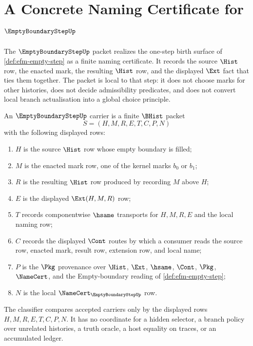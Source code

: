 \chapter{A Concrete Naming Certificate for $\EmptyBoundaryStepUp$}
\label{ch:concrete-instances-emptyboundarystep-namecert}

The $\EmptyBoundaryStepUp$ packet realizes the one-step birth surface of \autoref{def:efm-empty-step} as a finite naming certificate. It records the source $\Hist$ row, the enacted mark, the resulting $\Hist$ row, and the displayed $\Ext$ fact that ties them together. The packet is local to that step: it does not choose marks for other histories, does not decide admissibility predicates, and does not convert local branch actualisation into a global choice principle.

\begin{definition}
\label{def:empty-boundary-step-carrier}
An $\EmptyBoundaryStepUp$ carrier is a finite $\BHist$ packet
$$
S=(H,M,R,E,T,C,P,N)
$$
with the following displayed rows:
\begin{enumerate}
\item $H$ is the source $\Hist$ row whose empty boundary is filled;
\item $M$ is the enacted mark row, one of the kernel marks $b_0$ or $b_1$;
\item $R$ is the resulting $\Hist$ row produced by recording $M$ above $H$;
\item $E$ is the displayed $\Ext(H,M,R)$ row;
\item $T$ records componentwise $\hsame$ transports for $H,M,R,E$ and the local naming row;
\item $C$ records the displayed $\Cont$ routes by which a consumer reads the source row, enacted mark, result row, extension row, and local name;
\item $P$ is the $\Pkg$ provenance over $\Hist$, $\Ext$, $\hsame$, $\Cont$, $\Pkg$, $\NameCert$, and the Empty-boundary reading of \autoref{def:efm-empty-step};
\item $N$ is the local $\NameCert_{\EmptyBoundaryStepUp}$ row.
\end{enumerate}
The classifier compares accepted carriers only by the displayed rows $H,M,R,E,T,C,P,N$. It has no coordinate for a hidden selector, a branch policy over unrelated histories, a truth oracle, a host equality on traces, or an accumulated ledger.
\end{definition}

